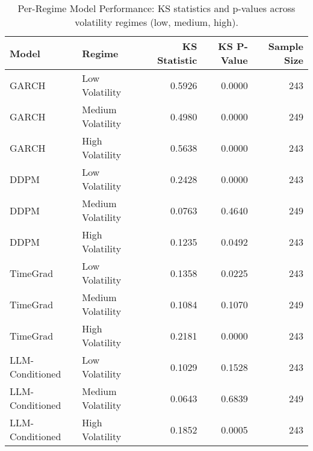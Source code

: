 \begin{table}[htbp]
\centering
\begin{tabular}{llrrr}
\toprule
Model & Regime & KS Statistic & KS P-Value & Sample Size \\
\midrule
GARCH & Low Volatility & 0.5926 & 0.0000 & 243 \\
GARCH & Medium Volatility & 0.4980 & 0.0000 & 249 \\
GARCH & High Volatility & 0.5638 & 0.0000 & 243 \\
DDPM & Low Volatility & 0.2428 & 0.0000 & 243 \\
DDPM & Medium Volatility & 0.0763 & 0.4640 & 249 \\
DDPM & High Volatility & 0.1235 & 0.0492 & 243 \\
TimeGrad & Low Volatility & 0.1358 & 0.0225 & 243 \\
TimeGrad & Medium Volatility & 0.1084 & 0.1070 & 249 \\
TimeGrad & High Volatility & 0.2181 & 0.0000 & 243 \\
LLM-Conditioned & Low Volatility & 0.1029 & 0.1528 & 243 \\
LLM-Conditioned & Medium Volatility & 0.0643 & 0.6839 & 249 \\
LLM-Conditioned & High Volatility & 0.1852 & 0.0005 & 243 \\
\bottomrule
\end{tabular}
\caption{Per-Regime Model Performance: KS statistics and p-values across volatility regimes (low, medium, high).}
\label{tab:per_regime_metrics}
\end{table}